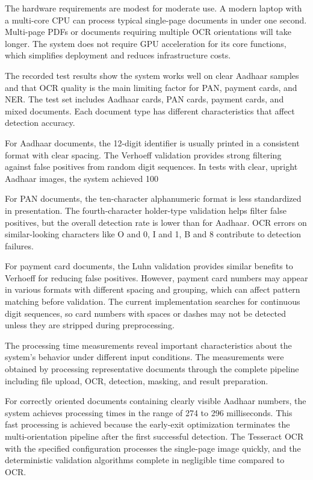 The hardware requirements are modest for moderate use. A modern laptop with a multi-core CPU can process typical single-page documents in under one second. Multi-page PDFs or documents requiring multiple OCR orientations will take longer. The system does not require GPU acceleration for its core functions, which simplifies deployment and reduces infrastructure costs.

\bigskip

The recorded test results show the system works well on clear Aadhaar samples and that OCR quality is the main limiting factor for PAN, payment cards, and NER. The test set includes Aadhaar cards, PAN cards, payment cards, and mixed documents. Each document type has different characteristics that affect detection accuracy.

For Aadhaar documents, the 12-digit identifier is usually printed in a consistent format with clear spacing. The Verhoeff validation provides strong filtering against false positives from random digit sequences. In tests with clear, upright Aadhaar images, the system achieved 100%

For PAN documents, the ten-character alphanumeric format is less standardized in presentation. The fourth-character holder-type validation helps filter false positives, but the overall detection rate is lower than for Aadhaar. OCR errors on similar-looking characters like O and 0, I and 1, B and 8 contribute to detection failures.

For payment card documents, the Luhn validation provides similar benefits to Verhoeff for reducing false positives. However, payment card numbers may appear in various formats with different spacing and grouping, which can affect pattern matching before validation. The current implementation searches for continuous digit sequences, so card numbers with spaces or dashes may not be detected unless they are stripped during preprocessing.

\bigskip

The processing time measurements reveal important characteristics about the system's behavior under different input conditions. The measurements were obtained by processing representative documents through the complete pipeline including file upload, OCR, detection, masking, and result preparation.

For correctly oriented documents containing clearly visible Aadhaar numbers, the system achieves processing times in the range of 274 to 296 milliseconds. This fast processing is achieved because the early-exit optimization terminates the multi-orientation pipeline after the first successful detection. The Tesseract OCR with the specified configuration processes the single-page image quickly, and the deterministic validation algorithms complete in negligible time compared to OCR.

